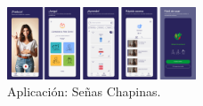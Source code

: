 \begin{figure}[H]
    \centering
    \includegraphics[width=0.5\textwidth]{figuras/capturas_app.png}
    \caption{Aplicación: Señas Chapinas.}
    \label{fig:capturas_app}
\end{figure}